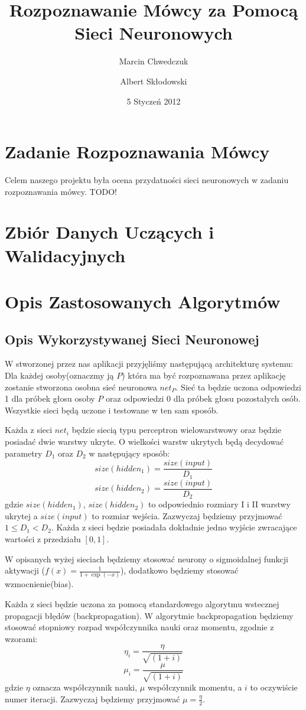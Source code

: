 \documentclass[a4paper]{article}
\author{Marcin Chwedczuk \and Albert Skłodowski}
\title{Rozpoznawanie Mówcy za Pomocą Sieci Neuronowych}
\date{5 Styczeń 2012}
\begin{document}
	\maketitle
	\tableofcontents
	
\section{Zadanie Rozpoznawania Mówcy}
	Celem naszego projektu była ocena przydatności sieci neuronowych
	w zadaniu rozpoznawania mówcy. TODO!

\section{Zbiór Danych Uczących i Walidacyjnych}
\section{Opis Zastosowanych Algorytmów}

	\subsection{Opis Wykorzystywanej Sieci Neuronowej}
	
	W stworzonej przez nas aplikacji przyjęliśmy następującą architekturę systemu:
	Dla każdej osoby(oznaczmy ją $P$) która ma być rozpoznawana przez aplikację zostanie stworzona osobna
	sieć neuronowa $net_P$. Sieć ta będzie uczona odpowiedzi 1 dla próbek głosu osoby $P$ oraz 
	odpowiedzi 0 dla próbek głosu pozostałych osób. 
	Wszystkie sieci będą uczone i testowane w ten sam sposób.  
	
	Każda z sieci $net_i$ będzie siecią typu perceptron wielowarstwowy oraz będzie posiadać
	dwie warstwy ukryte. O wielkości warstw ukrytych będą decydować parametry $D_1$ oraz $D_2$
	w następujący sposób:
	\[ size(hidden_1) = \frac{size(input)}{D_1} \]
	\[ size(hidden_2) = \frac{size(input)}{D_2} \] 
	gdzie $size(hidden_1)$, $size(hidden_2)$ to odpowiednio rozmiary I i II warstwy ukrytej
	a $size(input)$ to rozmiar wejścia. Zazwyczaj będziemy przyjmować $1 \leq D_1 < D_2$.
	Każda z sieci będzie posiadała dokładnie jedno wyjście zwracające wartości z przedziału $[0, 1]$.
	
	W opisanych wyżej sieciach będziemy stosować neurony o sigmoidalnej funkcji aktywacji 
	($f(x) = \frac{1}{1+\exp(-x)}$), dodatkowo będziemy stosować wzmocnienie(bias).
	
	Każda z sieci będzie uczona za pomocą standardowego algorytmu wstecznej propagacji błędów
	(backpropagation). W algorytmie backpropagation będziemy stosować
	stopniowy rozpad współczynnika nauki oraz momentu, zgodnie z wzorami:
	\[ \eta_i = \frac{\eta}{\sqrt{(1 + i)}} \]
	\[ \mu_i = \frac{\mu}{\sqrt{(1 + i)}} \]
	gdzie $\eta$ oznacza współczynnik nauki, $\mu$ współczynnik
	momentu, a $i$ to oczywiście numer iteracji. Zazwyczaj będziemy przyjmować $\mu = \frac{\eta}{2}$.
	
\end{document}
